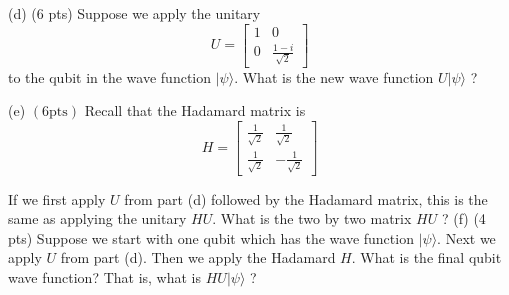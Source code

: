 \documentclass[11pt]{article}
\begin{document}
(d) (6 pts) Suppose we apply the unitary $$ U=\left[\begin{array}{cc} 1 & 0 \\ 0
& \frac{1-i}{\sqrt{2}} \end{array}\right] $$ to the qubit in the wave function
\(|\psi\rangle\). What is the new wave function \(U|\psi\rangle\) ?

(e) \((6 \mathrm{pts})\) Recall that the Hadamard matrix is $$
H=\left[\begin{array}{cc} \frac{1}{\sqrt{2}} & \frac{1}{\sqrt{2}}
\\ \frac{1}{\sqrt{2}} & -\frac{1}{\sqrt{2}} \end{array}\right] $$

If we first apply \(U\) from part (d) followed by the Hadamard matrix, this is the
same as applying the unitary \(H U\). What is the two by two matrix \(H U\) ? (f) (4
pts) Suppose we start with one qubit which has the wave function \(|\psi\rangle\). Next we
apply \(U\) from part (d). Then we apply the Hadamard \(H\). What is the final qubit
wave function? That is, what is \(H U|\psi\rangle\) ?
\end{document}
